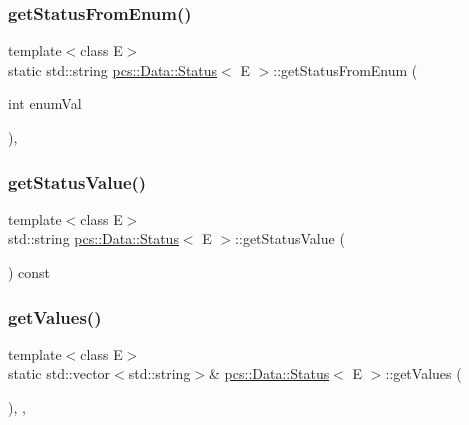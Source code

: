 \subsubsection{\texorpdfstring{get\+Status\+From\+Enum()}{getStatusFromEnum()}}
{\footnotesize\ttfamily template$<$class E$>$ \\
static std\+::string \hyperlink{classpcs_1_1Data_1_1Status}{pcs\+::\+Data\+::\+Status}$<$ E $>$\+::get\+Status\+From\+Enum (\begin{DoxyParamCaption}\item[{int}]{enum\+Val }\end{DoxyParamCaption})\hspace{0.3cm}{\ttfamily [inline]}, {\ttfamily [static]}}

\mbox{\label{classpcs_1_1Data_1_1Status_aeb95e9e9d69821ac78e4a8d2b81d7d32}} 
\subsubsection{\texorpdfstring{get\+Status\+Value()}{getStatusValue()}}
{\footnotesize\ttfamily template$<$class E$>$ \\
std\+::string \hyperlink{classpcs_1_1Data_1_1Status}{pcs\+::\+Data\+::\+Status}$<$ E $>$\+::get\+Status\+Value (\begin{DoxyParamCaption}{ }\end{DoxyParamCaption}) const\hspace{0.3cm}{\ttfamily [inline]}}

\mbox{\label{classpcs_1_1Data_1_1Status_aca3f97a9ec38f17378a6c869fd6cf8ea}} 
\subsubsection{\texorpdfstring{get\+Values()}{getValues()}}
{\footnotesize\ttfamily template$<$class E$>$ \\
static std\+::vector$<$std\+::string$>$\& \hyperlink{classpcs_1_1Data_1_1Status}{pcs\+::\+Data\+::\+Status}$<$ E $>$\+::get\+Values (\begin{DoxyParamCaption}{ }\end{DoxyParamCaption})\hspace{0.3cm}{\ttfamily [inline]}, {\ttfamily [static]}, {\ttfamily [protected]}}

